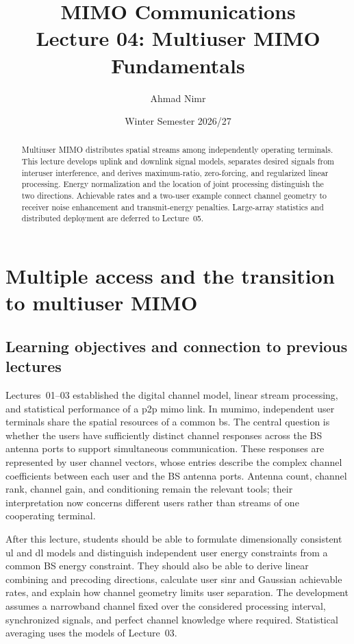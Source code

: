

\providecommand{\RH}{R_{\ma H}}
\title{MIMO Communications\\Lecture 04: Multiuser MIMO Fundamentals}
\author{Ahmad Nimr}
\date{Winter Semester 2026/27}


\acresetall
\maketitle
\begin{abstract}
Multiuser MIMO distributes spatial streams among independently operating terminals. This lecture develops uplink and downlink signal models, separates desired signals from interuser interference, and derives maximum-ratio, zero-forcing, and regularized linear processing. Energy normalization and the location of joint processing distinguish the two directions. Achievable rates and a two-user example connect channel geometry to receiver noise enhancement and transmit-energy penalties. Large-array statistics and distributed deployment are deferred to Lecture~05.
\end{abstract}
\acresetall
\tableofcontents
\newpage


\section{Multiple access and the transition to multiuser MIMO}

\subsection{Learning objectives and connection to previous lectures}
Lectures~01--03 established the digital channel model, linear stream processing, and statistical performance of a \ac{p2p} \ac{mimo} link. In \ac{mumimo}, independent user terminals share the spatial resources of a common \ac{bs}. The central question is whether the users have sufficiently distinct channel responses across the BS antenna ports to support simultaneous communication. These responses are represented by user channel vectors, whose entries describe the complex channel coefficients between each user and the BS antenna ports. Antenna count, channel rank, channel gain, and conditioning remain the relevant tools; their interpretation now concerns different users rather than streams of one cooperating terminal.

After this lecture, students should be able to formulate dimensionally consistent \ac{ul} and \ac{dl} models and distinguish independent user energy constraints from a common BS energy constraint. They should also be able to derive linear combining and precoding directions, calculate user \ac{sinr} and Gaussian achievable rates, and explain how channel geometry limits user separation. The development assumes a narrowband channel fixed over the considered processing interval, synchronized signals, and perfect channel knowledge where required. Statistical averaging uses the models of Lecture~03.

